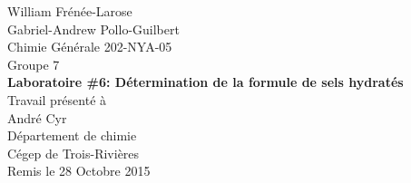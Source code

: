 \begin{titlepage}
\begin{center}
	William Frénée-Larose\\
	Gabriel-Andrew Pollo-Guilbert
	\\[36mm]
	Chimie Générale 202-NYA-05\\
	Groupe 7
	\\[36mm]
	\textbf{Laboratoire \#6: Détermination de la formule de sels hydratés}
	\\[36mm]
	Travail présenté à\\
	André Cyr
	\\[36mm]
	Département de chimie\\
	Cégep de Trois-Rivières\\
	Remis le 28 Octobre 2015\\
\end{center}
\end{titlepage}
